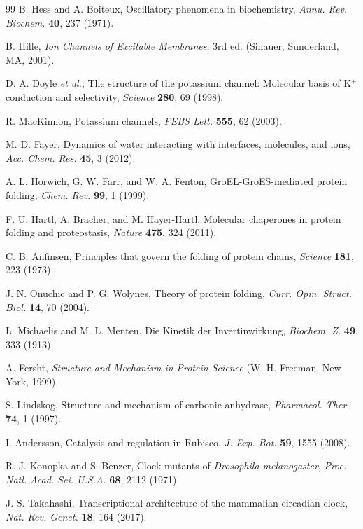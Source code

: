 \documentclass[aps,prd,twocolumn,superscriptaddress,floatfix,nofootinbib]{revtex4-2}
\theoremstyle{remark}
\begin{document}
\begin{thebibliography}{99}
B. Hess and A. Boiteux, Oscillatory phenomena in biochemistry, \textit{Annu. Rev. Biochem.} \textbf{40}, 237 (1971).

B. Hille, \textit{Ion Channels of Excitable Membranes}, 3rd ed. (Sinauer, Sunderland, MA, 2001).

D. A. Doyle \textit{et al.}, The structure of the potassium channel: Molecular basis of K$^+$ conduction and selectivity, \textit{Science} \textbf{280}, 69 (1998).

R. MacKinnon, Potassium channels, \textit{FEBS Lett.} \textbf{555}, 62 (2003).

M. D. Fayer, Dynamics of water interacting with interfaces, molecules, and ions, \textit{Acc. Chem. Res.} \textbf{45}, 3 (2012).

A. L. Horwich, G. W. Farr, and W. A. Fenton, GroEL-GroES-mediated protein folding, \textit{Chem. Rev.} \textbf{99}, 1 (1999).

F. U. Hartl, A. Bracher, and M. Hayer-Hartl, Molecular chaperones in protein folding and proteostasis, \textit{Nature} \textbf{475}, 324 (2011).

C. B. Anfinsen, Principles that govern the folding of protein chains, \textit{Science} \textbf{181}, 223 (1973).

J. N. Onuchic and P. G. Wolynes, Theory of protein folding, \textit{Curr. Opin. Struct. Biol.} \textbf{14}, 70 (2004).

L. Michaelis and M. L. Menten, Die Kinetik der Invertinwirkung, \textit{Biochem. Z.} \textbf{49}, 333 (1913).

A. Fersht, \textit{Structure and Mechanism in Protein Science} (W. H. Freeman, New York, 1999).

S. Lindskog, Structure and mechanism of carbonic anhydrase, \textit{Pharmacol. Ther.} \textbf{74}, 1 (1997).

I. Andersson, Catalysis and regulation in Rubisco, \textit{J. Exp. Bot.} \textbf{59}, 1555 (2008).

R. J. Konopka and S. Benzer, Clock mutants of \textit{Drosophila melanogaster}, \textit{Proc. Natl. Acad. Sci. U.S.A.} \textbf{68}, 2112 (1971).

J. S. Takahashi, Transcriptional architecture of the mammalian circadian clock, \textit{Nat. Rev. Genet.} \textbf{18}, 164 (2017).


\end{thebibliography}
\end{document}
